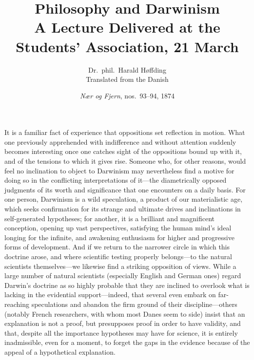 \documentclass[12pt,a4paper]{article}
\title{\textbf{Philosophy and Darwinism}\\[0.4em]
\large A Lecture Delivered at the Students' Association, 21 March}
\author{Dr.\ phil.\ Harald Høffding\\[4pt]
  \small Translated from the Danish}
\date{\emph{Nær og Fjern}, nos.\ 93--94, 1874}
\begin{document}
\maketitle
\thispagestyle{fancy}

\bigskip

It is a familiar fact of experience that oppositions set reflection in
motion. What one previously apprehended with indifference and without
attention suddenly becomes interesting once one catches sight of the
oppositions bound up with it, and of the tensions to which it gives
rise. Someone who, for other reasons, would feel no inclination to
object to Darwinism may nevertheless find a motive for doing so in
the conflicting interpretations of it---the diametrically opposed
judgments of its worth and significance that one encounters on a
daily basis. For one person, Darwinism is a wild speculation, a
product of our materialistic age, which seeks confirmation for its
strange and ultimate drives and inclinations in self-generated
hypotheses; for another, it is a brilliant and magnificent
conception, opening up vast perspectives, satisfying the human
mind's ideal longing for the infinite, and awakening enthusiasm for
higher and progressive forms of development. And if we return to
the narrower circle in which this doctrine arose, and where
scientific testing properly belongs---to the natural scientists
themselves---we likewise find a striking opposition of views. While
a large number of natural scientists (especially English and German
ones) regard Darwin's doctrine as so highly probable that they are
inclined to overlook what is lacking in the evidential support---indeed,
that several even embark on far-reaching speculations and abandon the
firm ground of their discipline---others (notably French researchers,
with whom most Danes seem to side) insist that an explanation is not
a proof, but presupposes proof in order to have validity, and that,
despite all the importance hypotheses may have for science, it is
entirely inadmissible, even for a moment, to forget the gaps in the
evidence because of the appeal of a hypothetical explanation.
\end{document}
